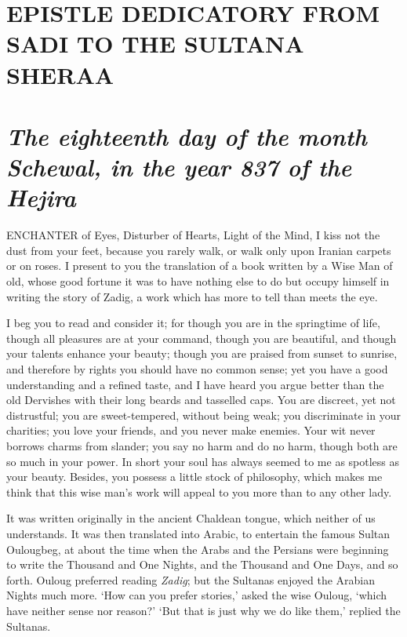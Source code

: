 \documentclass{article}
\begin{document}
\begin{center}
\section*{\textbf{EPISTLE DEDICATORY FROM SADI TO THE SULTANA SHERAA}}

\section*{\textit{\textbf{The eighteenth day of the month Schewal, in the year 
837 of the Hejira }}}

ENCHANTER of Eyes, Disturber of Hearts, Light of the Mind, I kiss not the dust 
from your feet, because you rarely walk, or walk only upon Iranian carpets or on 
roses. I present to you the translation of a book written by a Wise Man of old, 
whose good fortune it was to have nothing else to do but occupy himself in writing 
the story of Zadig, a work which has more to tell than meets the eye. 

I beg you to read and consider it; for though you are in the springtime of life, 
though all pleasures are at your command, though you are beautiful, and though 
your talents enhance your beauty; though you are praised from sunset to sunrise, 
and therefore by rights you should have no common sense; yet you have a good understanding 
and a refined taste, and I have heard you argue better than the old Dervishes with 
their long beards and tasselled caps. You are discreet, yet not distrustful; you 
are sweet-tempered, without being weak; you discriminate in your charities; you 
love your friends, and you never make enemies. Your wit never borrows charms from 
slander; you say no harm and do no harm, though both are so much in your power. 
In short your soul has always seemed to me as spotless as your beauty. Besides, 
you possess a little stock of philosophy, which makes me think that this wise man's 
work will appeal to you more than to any other lady. 

It was written originally in the ancient Chaldean tongue, which neither of us understands. 
It was then translated into Arabic, to entertain the famous Sultan Oulougbeg, at 
about the time when the Arabs and the Persians were beginning to write the Thousand 
and One Nights, and the Thousand and One Days, and so forth. Ouloug preferred reading 
\textit{Zadig}; but the Sultanas enjoyed the Arabian Nights much more. `How can 
you prefer stories,' asked the wise Ouloug, `which have neither sense nor reason?' 
`But that is just why we do like them,' replied the Sultanas. 


\end{center}
\end{document}
